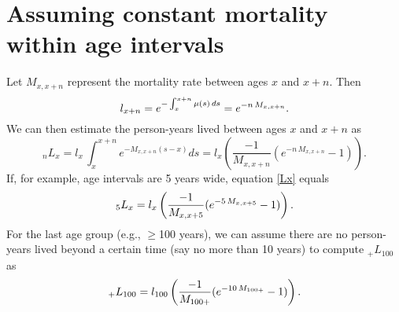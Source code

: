 \documentclass[12pt,letterpaper]{article}
\theoremstyle{plain}
\begin{document}
\section*{Assuming constant mortality within age intervals}
Let $M_{x,x+n}$ represent the mortality rate between ages $x$ and $x+n$. Then 
\begin{equation}
l_{x+n}=e^{-\int_x^{x+n}\mu(s)\,ds}=e^{-n\,M_{x,x+n}}.\notag
\end{equation}
We can then estimate the person-years lived between ages $x$ and $x+n$ as
\begin{equation}
_nL_{x}=l_x\,\int_x^{x+n} e^{-M_{x,x+n}(s-x)} ds=l_x \left(\frac{-1}{M_{x,x+n}}(e^{-n\,M_{x,x+n}}-1) \right).
\label{Lx}
\end{equation}
If, for example, age intervals are 5 years wide, equation \eqref{Lx} equals
\begin{equation}
_5L_{x}=l_x \left(\frac{-1}{M_{x,x+5}}(e^{-5\,M_{x,x+5}}-1) \right).\notag
\end{equation}
For the last age group (e.g., $\geq$100 years), we can assume there
are no person-years lived beyond a certain time (say no more than 10 years) to compute $_+L_{100}$ as
\begin{equation}
_+L_{100}=l_{100} \left(\frac{-1}{M_{100+}}(e^{-10\,M_{100+}}-1) \right).\notag
\end{equation}
\end{document}
